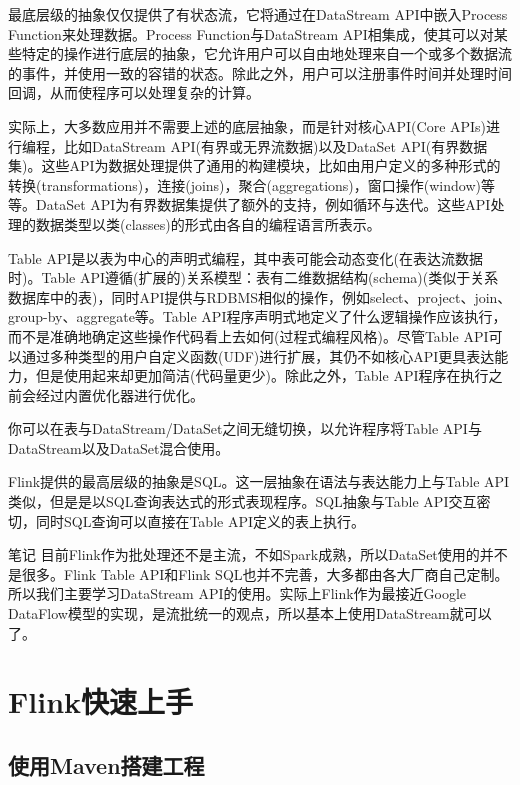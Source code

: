 \documentclass[oneside]{ctexbook}
\begin{document}
最底层级的抽象仅仅提供了有状态流，它将通过在DataStream API中嵌入Process Function来处理数据。Process Function与DataStream API相集成，使其可以对某些特定的操作进行底层的抽象，它允许用户可以自由地处理来自一个或多个数据流的事件，并使用一致的容错的状态。除此之外，用户可以注册事件时间并处理时间回调，从而使程序可以处理复杂的计算。

实际上，大多数应用并不需要上述的底层抽象，而是针对核心API(Core APIs)进行编程，比如DataStream API(有界或无界流数据)以及DataSet API(有界数据集)。这些API为数据处理提供了通用的构建模块，比如由用户定义的多种形式的转换(transformations)，连接(joins)，聚合(aggregations)，窗口操作(window)等等。DataSet API为有界数据集提供了额外的支持，例如循环与迭代。这些API处理的数据类型以类(classes)的形式由各自的编程语言所表示。

Table API是以表为中心的声明式编程，其中表可能会动态变化(在表达流数据时)。Table API遵循(扩展的)关系模型：表有二维数据结构(schema)(类似于关系数据库中的表)，同时API提供与RDBMS相似的操作，例如select、project、join、group-by、aggregate等。Table API程序声明式地定义了什么逻辑操作应该执行，而不是准确地确定这些操作代码看上去如何(过程式编程风格)。尽管Table API可以通过多种类型的用户自定义函数(UDF)进行扩展，其仍不如核心API更具表达能力，但是使用起来却更加简洁(代码量更少)。除此之外，Table API程序在执行之前会经过内置优化器进行优化。

你可以在表与DataStream/DataSet之间无缝切换，以允许程序将Table API与DataStream以及DataSet混合使用。

Flink提供的最高层级的抽象是SQL。这一层抽象在语法与表达能力上与Table API类似，但是是以SQL查询表达式的形式表现程序。SQL抽象与Table API交互密切，同时SQL查询可以直接在Table API定义的表上执行。

\begin{bclogo}[logo=\bcinfo, couleurBarre=orange, noborder=true, couleur=white]{笔记}
目前Flink作为批处理还不是主流，不如Spark成熟，所以DataSet使用的并不是很多。Flink Table API和Flink SQL也并不完善，大多都由各大厂商自己定制。所以我们主要学习DataStream API的使用。实际上Flink作为最接近Google DataFlow模型的实现，是流批统一的观点，所以基本上使用DataStream就可以了。
\end{bclogo}

\chapter{Flink快速上手}

\section{使用Maven搭建工程}
\end{document}
